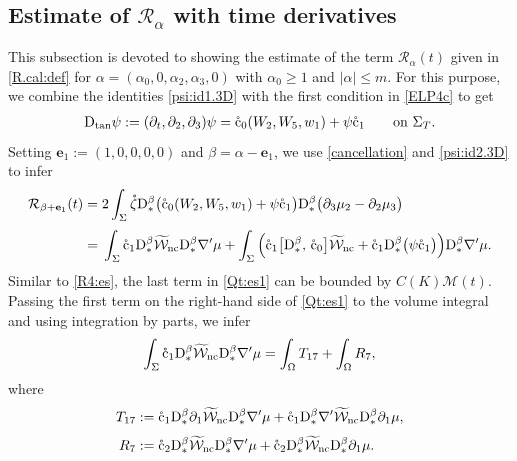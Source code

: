 \documentclass[twoside,11pt]{article}
\numberwithin{equation}{section}
\def\p{\partial}
\begin{document}
	\subsection{Estimate of $\mathcal{R}_{\alpha}$ with time derivatives}\label{sec:Qes2}
This subsection is devoted to showing the estimate of the term $\mathcal{R}_{\alpha}(t)$ given in \eqref{R.cal:def} for $\alpha=(\alpha_0,0,\alpha_2, \alpha_3,0)$ with $\alpha_0\geq 1$ and $|\alpha|\leq m$.
For this purpose,
we combine the identities \eqref{psi:id1.3D} with the first condition in \eqref{ELP4c} to get
\begin{align}
	\mathrm{D}_{\rm tan }\psi
	:=(\p_t, \p_2,\p_3)\psi
	= \mathring{\rm c}_0 (W_2,W_5,w_1)
	+\psi \mathring{\rm c}_1
	\qquad\textrm{on }\Sigma_{T}.
	\label{psi:id2.3D}
\end{align}
Setting $\mathbf{e}_1:=(1,0,0,0,0)$ and $\beta=\alpha-\mathbf{e}_1$,
we use \eqref{cancellation} and \eqref{psi:id2.3D} to infer
\begin{align}
	\mathcal{R}_{\beta+\mathbf{e}_1}(t)=\; & 2 \int_{\Sigma} \mathring{\zeta}
	  \mathrm{D}_*^{\beta} \big(\mathring{\rm c}_0 (W_2,W_5,w_1)
	  +\psi \mathring{\rm c}_1
	  \big)\mathrm{D}_*^{\beta} \big(\p_3\mu_2-\p_2\mu_3\big)\nonumber\\[1mm]
=\; &   \int_{\Sigma} \mathring{\rm c}_1\mathrm{D}_*^{\beta} \widetilde{\mathcal{W}}_{\rm nc}\mathrm{D}_*^{\beta} \nabla'\mu
+\int_{\Sigma} \Big(\mathring{\rm c}_1\big[\mathrm{D}_*^{\beta},\,\mathring{\rm c}_0  \big]\widetilde{\mathcal{W}}_{\rm nc}
+  \mathring{\rm c}_1\mathrm{D}_*^{\beta} \big( \psi \mathring{\rm c}_1\big)\Big)
\mathrm{D}_*^{\beta} \nabla'\mu.
\label{Qt:es1}
\end{align}
Similar to \eqref{R4:es},
the last term in \eqref{Qt:es1} can be bounded by $C(K)\mathcal{M}(t)$.
Passing the first term on the right-hand side of \eqref{Qt:es1} to the volume integral and using integration by parts, we infer
\begin{align}
	\int_{\Sigma} \mathring{\rm c}_1\mathrm{D}_*^{\beta} \widetilde{\mathcal{W}}_{\rm nc}\mathrm{D}_*^{\beta} \nabla'\mu
	=\int_{\Omega} T_{17}+\int_{\Omega}R_7,
	\label{Qt:es2}
\end{align}
where
\begin{align}
	T_{17}:=\;&\mathring{\rm c}_1\mathrm{D}_*^{\beta} \p_1 \widetilde{\mathcal{W}}_{\rm nc}\mathrm{D}_*^{\beta} \nabla'\mu
	+ \mathring{\rm c}_1\mathrm{D}_*^{\beta} \nabla' \widetilde{\mathcal{W}}_{\rm nc}\mathrm{D}_*^{\beta} \p_1 \mu,\nonumber\\[1mm]
	R_7:=\;& \mathring{\rm c}_2\mathrm{D}_*^{\beta}   \widetilde{\mathcal{W}}_{\rm nc}\mathrm{D}_*^{\beta} \nabla'\mu
	+ \mathring{\rm c}_2\mathrm{D}_*^{\beta} \widetilde{\mathcal{W}}_{\rm nc}\mathrm{D}_*^{\beta} \p_1 \mu.
	\nonumber
\end{align}
\end{document}
